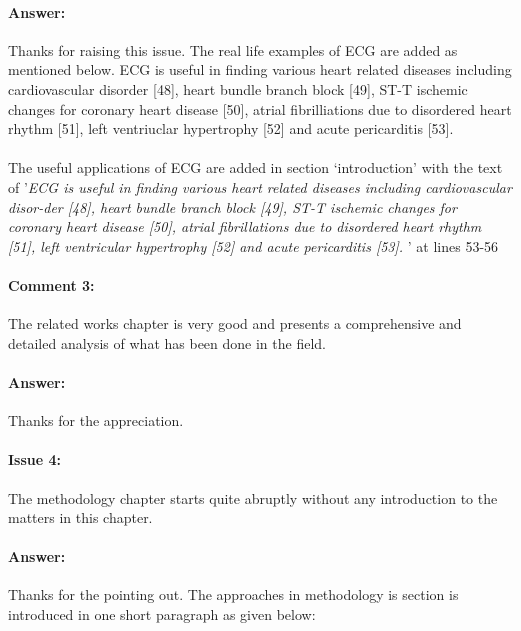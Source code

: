 \documentclass{article}
\begin{document}
\paragraph{Answer:}
Thanks for raising this issue. The real life examples of ECG are added as mentioned below.
ECG is useful in finding various heart related diseases including cardiovascular disorder [48], heart bundle branch block [49], ST-T ischemic changes for coronary heart disease [50], atrial fibrilliations due to disordered heart rhythm [51], left ventriuclar hypertrophy [52] and acute pericarditis [53]. \\\\

The useful applications of ECG are added in section `introduction' with the text of '\textit{ECG is useful in finding various heart related diseases including cardiovascular disor-der [48], heart bundle branch block [49], ST-T ischemic changes for coronary heart disease [50], atrial fibrillations due to disordered heart rhythm [51], left ventricular hypertrophy [52] and acute pericarditis [53]. }' at lines 53-56

\paragraph{Comment 3:}
\begin{displayquote}
The related works chapter is very good and presents a comprehensive and detailed analysis of what has been done in the field.
\end{displayquote}

\paragraph{Answer:}
Thanks for the appreciation. 

\paragraph{Issue 4:}
\begin{displayquote}
The methodology chapter starts quite abruptly without any introduction to the matters in this chapter.
\end{displayquote}

\paragraph{Answer:}
Thanks for the pointing out. The approaches in methodology is section is introduced in one short paragraph as given below:
\end{document}
